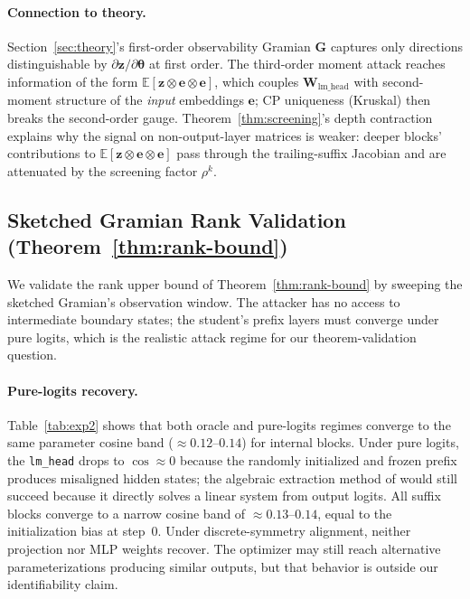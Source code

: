 \documentclass{article}
\newcommand{\E}{\mathbb{E}}
\newcommand{\btheta}{\boldsymbol{\theta}}
\newcommand{\bz}{\mathbf{z}}
\newcommand{\bW}{\mathbf{W}}
\newcommand{\bG}{\mathbf{G}}
\newcommand{\be}{\mathbf{e}}
\begin{document}
\paragraph{Connection to theory.} Section~\ref{sec:theory}'s first-order observability Gramian $\bG$ captures only directions distinguishable by $\partial \bz / \partial \btheta$ at first order. The third-order moment attack reaches information of the form $\E[\bz \otimes \be \otimes \be]$, which couples $\bW_{\text{lm\_head}}$ with second-moment structure of the \emph{input} embeddings $\be$; CP uniqueness (Kruskal) then breaks the second-order gauge. Theorem~\ref{thm:screening}'s depth contraction explains why the signal on non-output-layer matrices is weaker: deeper blocks' contributions to $\E[\bz \otimes \be \otimes \be]$ pass through the trailing-suffix Jacobian and are attenuated by the screening factor $\rho^k$.

\subsection{Sketched Gramian Rank Validation (Theorem~\ref{thm:rank-bound})}
\label{sec:exp-gramian}

We validate the rank upper bound of Theorem~\ref{thm:rank-bound} by sweeping the sketched Gramian's observation window. The attacker has no access to intermediate boundary states; the student's prefix layers must converge under pure logits, which is the realistic attack regime for our theorem-validation question.

\paragraph{Pure-logits recovery.}
Table~\ref{tab:exp2} shows that both oracle and pure-logits regimes converge to the same parameter cosine band ($\approx 0.12$--$0.14$) for internal blocks. Under pure logits, the \texttt{lm\_head} drops to $\cos \approx 0$ because the randomly initialized and frozen prefix produces misaligned hidden states; the algebraic extraction method of \citet{carlini2024stealing} would still succeed because it directly solves a linear system from output logits. All suffix blocks converge to a narrow cosine band of $\approx 0.13$--$0.14$, equal to the initialization bias at step~0. Under discrete-symmetry alignment, neither projection nor MLP weights recover. The optimizer may still reach alternative parameterizations producing similar outputs, but that behavior is outside our identifiability claim.
\end{document}
